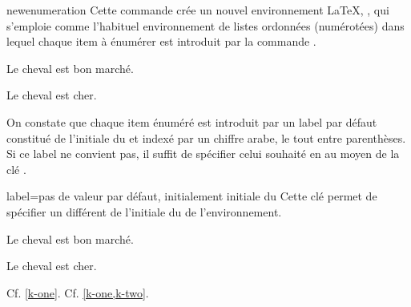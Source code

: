 \documentclass[english,nolocaltoc]{nwejmart}
\newtheorem[style=definition]{fait}
\newtheorem[title=expérience]{experience}
\newtheorem[title-plural=anneaux]{anneau}
\newtheorem[title=idéal,title-plural=idéaux]{ideal}
\begin{document}
\begin{docCommand}[doc new=2019-03-18]{newenumeration}{}
  Cette commande crée un nouvel environnement \LaTeX{}, , qui
  s'emploie comme l'habituel environnement  de
  listes ordonnées (numérotées) dans lequel chaque item à énumérer
  est introduit par la commande .

\begin{preamblecode}
\end{preamblecode}
\begin{bodycode}
\begin{conventions}
\item Le cheval est bon marché.
\item Le cheval est cher.
\end{conventions}
\end{bodycode}

  On constate que chaque item énuméré est introduit par un label par défaut
  constitué de l'initiale du  et indexé par un chiffre arabe, le tout
  entre parenthèses. Si ce label ne convient pas, il suffit de spécifier celui
  souhaité en  au moyen de la clé .
  \begin{docKey}{label}{={}}{pas de
      valeur par défaut, initialement initiale du }
    Cette clé permet de spécifier un  différent de l'initiale du
     de l'environnement.
  \end{docKey}
\begin{preamblecode}
\end{preamblecode}
\begin{bodycode}[listing and text,listing options={deletekeywords={[2]label}}]
\begin{conventions}
\item\label{k-one} Le cheval est bon marché.
\item\label{k-two} Le cheval est cher.
\end{conventions}
Cf. \vref{k-one}. Cf. \vref{k-one,k-two}.
\end{bodycode}


\end{docCommand}
\end{document}
